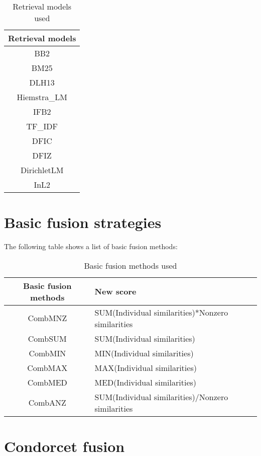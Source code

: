     \begin{table}[H]
        \centering
        \begin{tabular}{c}
		\toprule
        \textbf{Retrieval models} \\ \toprule
        BB2 \\
        BM25 \\
        DLH13 \\
        Hiemstra\_LM \\
        IFB2 \\
        TF\_IDF \\
        DFIC \\
        DFIZ \\
        DirichletLM \\
        InL2 \\
        \bottomrule
        \end{tabular}
        \caption{Retrieval models used}
    \end{table}

    \section{Basic fusion strategies}

    The following table shows a list of basic fusion methods:

    \begin{table}[H]
        \centering
        \begin{tabular}{c p{4cm}}
        \toprule
        \textbf{Basic fusion methods} & \textbf{New score} \\ \toprule
        CombMNZ & SUM(Individual similarities)*Nonzero similarities \\ \hline
        CombSUM & SUM(Individual similarities) \\ \hline
        CombMIN & MIN(Individual similarities) \\ \hline
        CombMAX & MAX(Individual similarities) \\ \hline
        CombMED & MED(Individual similarities) \\ \hline
        CombANZ & SUM(Individual similarities)/Nonzero similarities \\ \bottomrule
        \end{tabular}
        \caption{Basic fusion methods used}
    \end{table}
    
    \section{Condorcet fusion}

